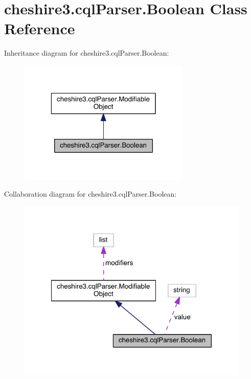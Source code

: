 \hypertarget{classcheshire3_1_1cql_parser_1_1_boolean}{\section{cheshire3.\-cql\-Parser.\-Boolean Class Reference}
\label{classcheshire3_1_1cql_parser_1_1_boolean}
}


Inheritance diagram for cheshire3.\-cql\-Parser.\-Boolean\-:
\nopagebreak
\begin{figure}[H]
\begin{center}
\leavevmode
\includegraphics[width=232pt]{classcheshire3_1_1cql_parser_1_1_boolean__inherit__graph}
\end{center}
\end{figure}


Collaboration diagram for cheshire3.\-cql\-Parser.\-Boolean\-:
\nopagebreak
\begin{figure}[H]
\begin{center}
\leavevmode
\includegraphics[width=314pt]{classcheshire3_1_1cql_parser_1_1_boolean__coll__graph}
\end{center}
\end{figure}
